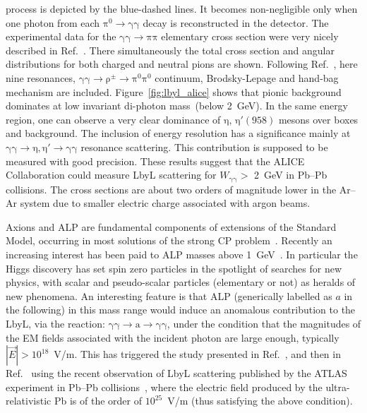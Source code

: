 process is depicted by the blue-dashed lines. It becomes non-negligible only when one photon from each $\mathrm{\pi^0\to\gamma\gamma}$ decay is reconstructed in the detector.
The experimental data for the $\mathrm{\gamma\gamma\to\pi\pi}$ elementary cross section were very nicely described in Ref.~\cite{Klusek-Gawenda:2013rtu}.
There simultaneously the total cross section and angular distributions for both charged and neutral pions are shown.
Following Ref.~\cite{Klusek-Gawenda:2013rtu}, here nine resonances,
$\mathrm{\gamma\gamma\to\rho^\pm\to\pi^0\pi^0}$ continuum, Brodsky-Lepage and hand-bag mechanism are included. Figure~\ref{fig:lbyl_alice} shows that pionic background dominates at low invariant di-photon mass~(below 2~GeV).
In the same energy region, one can observe a very clear dominance of
$\mathrm{\eta}$, $\mathrm{\eta'(958)}$ mesons over boxes and background.
The inclusion of energy resolution has a significance mainly at
$\mathrm{\gamma\gamma\to\eta,\eta'\to\gamma\gamma}$ resonance scattering.
This contribution is supposed to be measured with good precision.
These results suggest that the ALICE Collaboration could measure LbyL scattering for $W_{\mathrm{\gamma\gamma}}>$ 2~GeV in Pb--Pb collisions. The cross sections are about two orders of magnitude lower in the Ar--Ar system due to smaller electric charge associated with argon beams.


Axions and ALP are fundamental components of extensions of the Standard Model, occurring in most solutions of the strong CP problem~\cite{Peccei:1977hh,PhysRevLett.38.1440}. Recently an increasing interest has been paid to ALP masses
above 1~GeV~\cite{Bauer:2017ris}. In particular the Higgs discovery has set spin zero particles in the spotlight of searches for new physics, with scalar and pseudo-scalar particles (elementary or not) as heralds of new phenomena. An interesting feature is that ALP (generically labelled as $a$ in the following) in this mass range would induce an anomalous contribution to the LbyL, via the reaction:
$\mathrm{\gamma \gamma \rightarrow a \rightarrow \gamma \gamma}$,
under the condition that the magnitudes of the EM fields associated
with the incident photon are large enough, typically $\left|\vec{E}\right| >10^{18}$~V/m.
This has triggered  the study presented in Ref.~\cite{Knapen:2016moh},
and then in Ref.~\cite{Knapen:2017ebd} using the recent observation of LbyL scattering published by the ATLAS experiment in Pb--Pb collisions~\cite{Aaboud:2017bwk}, where the electric field produced by the ultra-relativistic Pb is of the order of $10^{25}$~V/m (thus satisfying the above condition).

